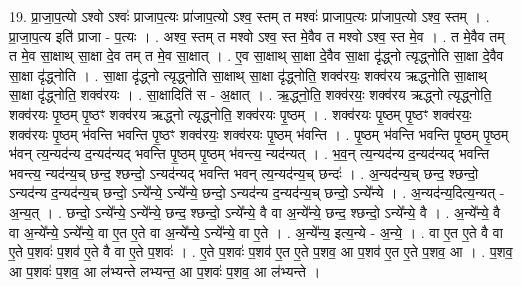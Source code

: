 \documentclass[17pt]{extarticle}
\begin{document}
19. प्रा॒जा॒प॒त्यो ऽश्वो ऽश्वः॑ प्राजाप॒त्यः प्रा॑जाप॒त्यो ऽश्व॒ स्तम् त मश्वः॑ प्राजाप॒त्यः प्रा॑जाप॒त्यो ऽश्व॒ स्तम् । . प्रा॒जा॒प॒त्य इति॑ प्राजा - प॒त्यः । . अश्व॒ स्तम् त मश्वो ऽश्व॒ स्त मे॒वैव त मश्वो ऽश्व॒ स्त मे॒व । . त मे॒वैव तम् त मे॒व सा॒क्षाथ् सा॒क्षा दे॒व तम् त मे॒व सा॒क्षात् । . ए॒व सा॒क्षाथ् सा॒क्षा दे॒वैव सा॒क्षा दृ॑द्ध्नो त्यृद्ध्नोति सा॒क्षा दे॒वैव सा॒क्षा दृ॑द्ध्नोति । . सा॒क्षा दृ॑द्ध्नो त्यृद्ध्नोति सा॒क्षाथ् सा॒क्षा दृ॑द्ध्नोति॒ शक्व॑रयः॒ शक्व॑रय ऋद्ध्नोति सा॒क्षाथ् सा॒क्षा दृ॑द्ध्नोति॒ शक्व॑रयः । . सा॒क्षादिति॑ स - अ॒क्षात् । . ऋ॒द्ध्नो॒ति॒ शक्व॑रयः॒ शक्व॑रय ऋद्ध्नो त्यृद्ध्नोति॒ शक्व॑रयः पृ॒ष्ठम् पृ॒ष्ठꣳ शक्व॑रय ऋद्ध्नो त्यृद्ध्नोति॒ शक्व॑रयः पृ॒ष्ठम् । . शक्व॑रयः पृ॒ष्ठम् पृ॒ष्ठꣳ शक्व॑रयः॒ शक्व॑रयः पृ॒ष्ठम् भ॑वन्ति भवन्ति पृ॒ष्ठꣳ शक्व॑रयः॒ शक्व॑रयः पृ॒ष्ठम् भ॑वन्ति । . पृ॒ष्ठम् भ॑वन्ति भवन्ति पृ॒ष्ठम् पृ॒ष्ठम् भ॑वन् त्य॒न्यद॑न्य द॒न्यद॑न्यद् भवन्ति पृ॒ष्ठम् पृ॒ष्ठम् भ॑वन्त्य॒ न्यद॑न्यत् । . भ॒व॒न् त्य॒न्यद॑न्य द॒न्यद॑न्यद् भवन्ति भवन्त्य॒ न्यद॑न्य॒च् छन्द॒ श्छन्दो॒ ऽन्यद॑न्यद् भवन्ति भवन् त्य॒न्यद॑न्य॒च् छन्दः॑ । . अ॒न्यद॑न्य॒च् छन्द॒ श्छन्दो॒ ऽन्यद॑न्य द॒न्यद॑न्य॒च् छन्दो॒ ऽन्ये᳚न्ये॒ ऽन्ये᳚न्ये॒ छन्दो॒ ऽन्यद॑न्य द॒न्यद॑न्य॒च् छन्दो॒ ऽन्ये᳚न्ये । . अ॒न्यद॑न्य॒दित्य॒न्यत् - अ॒न्य॒त् । . छन्दो॒ ऽन्ये᳚न्ये॒ ऽन्ये᳚न्ये॒ छन्द॒ श्छन्दो॒ ऽन्ये᳚न्ये॒ वै वा अ॒न्ये᳚न्ये॒ छन्द॒ श्छन्दो॒ ऽन्ये᳚न्ये॒ वै । . अ॒न्ये᳚न्ये॒ वै वा अ॒न्ये᳚न्ये॒ ऽन्ये᳚न्ये॒ वा ए॒त ए॒ते वा अ॒न्ये᳚न्ये॒ ऽन्ये᳚न्ये॒ वा ए॒ते । . अ॒न्ये᳚न्य॒ इत्य॒न्ये - अ॒न्ये॒ । . वा ए॒त ए॒ते वै वा ए॒ते प॒शवः॑ प॒शव॑ ए॒ते वै वा ए॒ते प॒शवः॑ । . ए॒ते प॒शवः॑ प॒शव॑ ए॒त ए॒ते प॒शव॒ आ प॒शव॑ ए॒त ए॒ते प॒शव॒ आ । . प॒शव॒ आ प॒शवः॑ प॒शव॒ आ ल॑भ्यन्ते लभ्यन्त॒ आ प॒शवः॑ प॒शव॒ आ ल॑भ्यन्ते । \newline
\end{document}

